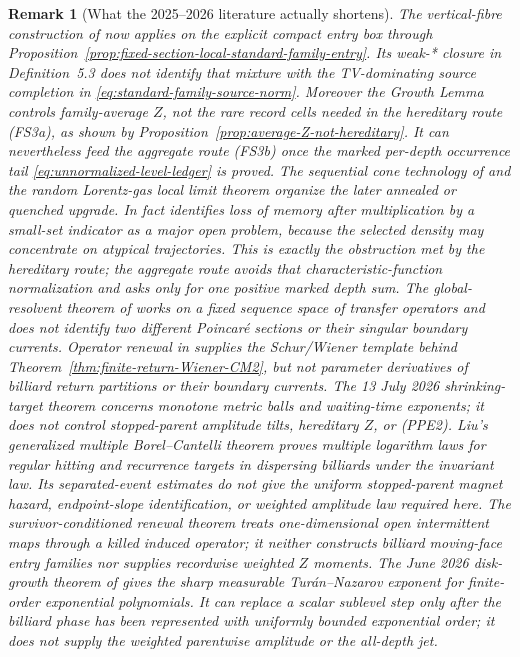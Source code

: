 \documentclass[11pt]{article}
\newtheorem{remark}[theorem]{Remark}
\begin{document}
\begin{remark}[What the 2025--2026 literature actually shortens]
\label{rem:fixed-section-latest-literature}
The vertical-fibre construction of
\cite[Lemmas~5.1--5.2]{CanestrariHoles} now applies on the explicit compact
entry box through
Proposition~\ref{prop:fixed-section-local-standard-family-entry}.  Its
weak-* closure in Definition~5.3 does not identify that mixture with the
TV-dominating source completion in
\eqref{eq:standard-family-source-norm}.  Moreover the Growth Lemma controls
family-average $Z$, not the rare record cells needed in the hereditary route
\textup{(FS3a)}, as shown by
Proposition~\ref{prop:average-Z-not-hereditary}.  It can nevertheless feed
the aggregate route \textup{(FS3b)} once the marked per-depth occurrence
tail \eqref{eq:unnormalized-level-ledger} is proved.  The sequential cone technology of
\cite{DLcones} and the random Lorentz-gas local limit
theorem \cite{DemersPeneZhang} organize the later annealed or quenched
upgrade.  In fact \cite[Problem~8.7]{DLreview} identifies loss of memory
after multiplication by a small-set indicator as a major open problem,
because the selected density may concentrate on atypical trajectories.
This is exactly the obstruction met by the hereditary route; the aggregate
route avoids that characteristic-function normalization and asks only for
one positive marked depth sum.  The global-resolvent theorem of \cite{GalatoloLucarini} works on a
fixed sequence space of transfer operators and does not identify two
different Poincar\'e sections or their singular boundary currents.  Operator
renewal in \cite{MelbourneTerhesiu} supplies the Schur/Wiener template behind
Theorem~\ref{thm:finite-return-Wiener-CM2}, but not parameter derivatives of
billiard return partitions or their boundary currents.  The 13 July 2026
shrinking-target theorem \cite{BajovicPetkovic2026} concerns monotone metric
balls and waiting-time exponents; it does not control stopped-parent
amplitude tilts, hereditary $Z$, or \textup{(PPE2)}.  Liu's generalized
multiple Borel--Cantelli theorem \cite{LiuMultipleBC} proves multiple
logarithm laws for regular hitting and recurrence targets in dispersing
billiards under the invariant law.  Its separated-event estimates do not
give the uniform stopped-parent magnet hazard, endpoint-slope
identification, or weighted amplitude law required here.  The survivor-conditioned
renewal theorem \cite{Duvall2026} treats one-dimensional open intermittent
maps through a killed induced operator; it neither constructs billiard
moving-face entry families nor supplies recordwise weighted $Z$ moments.
The June
2026 disk-growth theorem of \cite{FriedlandRemez2026} gives the sharp
measurable Tur\'an--Nazarov exponent for finite-order exponential
polynomials.  It can replace a scalar sublevel step only after the billiard
phase has been represented with uniformly bounded exponential order; it
does not supply the weighted parentwise amplitude or the all-depth jet.


\end{remark}
\end{document}
